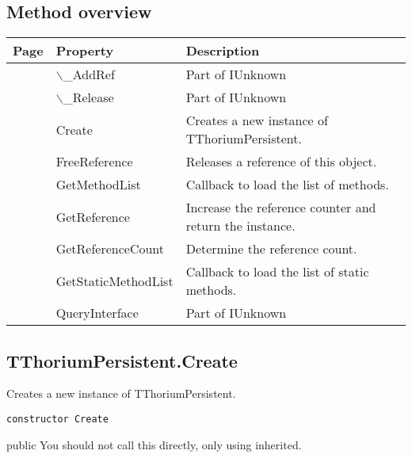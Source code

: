 \subsection{Method overview}
\label{thoriumcore:thorium:tthoriumpersistent:methods}
\begin{tabularx}{\textwidth}{llX}
Page & Property & Description  \\ \hline
\pageref{thoriumcore:thorium:tthoriumpersistent:addref} & $\backslash$\_AddRef  & Part of IUnknown \\
\pageref{thoriumcore:thorium:tthoriumpersistent:release} & $\backslash$\_Release  & Part of IUnknown \\
\pageref{thoriumcore:thorium:tthoriumpersistent:create} & Create  & Creates a new instance of TThoriumPersistent. \\
\pageref{thoriumcore:thorium:tthoriumpersistent:freereference} & FreeReference  & Releases a reference of this object. \\
\pageref{thoriumcore:thorium:tthoriumpersistent:getmethodlist} & GetMethodList  & Callback to load the list of methods. \\
\pageref{thoriumcore:thorium:tthoriumpersistent:getreference} & GetReference  & Increase the reference counter and return the instance. \\
\pageref{thoriumcore:thorium:tthoriumpersistent:getreferencecount} & GetReferenceCount  & Determine the reference count. \\
\pageref{thoriumcore:thorium:tthoriumpersistent:getstaticmethodlist} & GetStaticMethodList  & Callback to load the list of static methods. \\
\pageref{thoriumcore:thorium:tthoriumpersistent:queryinterface} & QueryInterface  & Part of IUnknown \\
\hline
\end{tabularx}
\subsection{TThoriumPersistent.Create}
\label{thoriumcore:thorium:tthoriumpersistent:create}
\begin{FPCList}
\Synopsis
Creates a new instance of TThoriumPersistent.\Declaration 

\begin{verbatim}
constructor Create
\end{verbatim}
\Visibility
public
\Description
You should not call this directly, only using inherited. \Errors
\end{FPCList}
